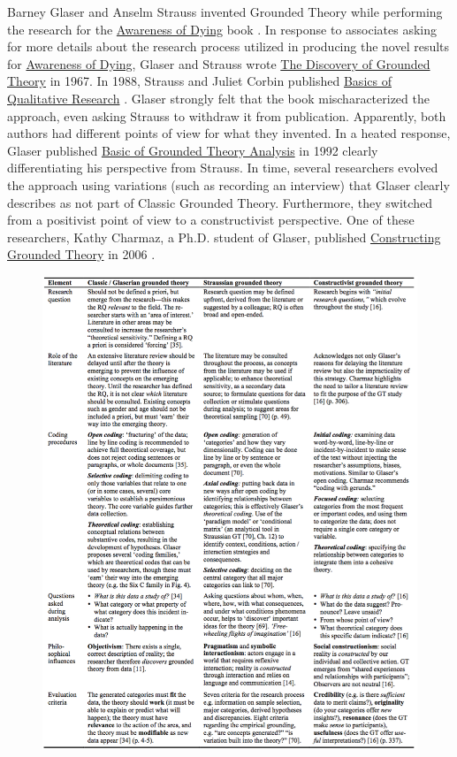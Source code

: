 Barney Glaser and Anselm Strauss invented Grounded Theory while performing the research for the \ul{Awareness of Dying} book \cite{GlaserAwarenessOfDying}. In response to associates asking for more details about the research process utilized in producing the novel results for \ul{Awareness of Dying}, Glaser and Strauss wrote \ul{The Discovery of Grounded Theory} \cite{GlaserDiscovery} in 1967. In 1988, Strauss and Juliet Corbin published \ul{Basics of Qualitative Research} \cite{Strauss1988Basics}. Glaser strongly felt that the book mischaracterized the approach, even asking Strauss to withdraw it from publication. Apparently, both authors had different points of view for what they invented. In a heated response, Glaser published \ul{Basic of Grounded Theory Analysis} in 1992 clearly differentiating his perspective from Strauss. In time, several researchers evolved the approach using variations (such as recording an interview) that Glaser clearly describes as not part of Classic Grounded Theory. Furthermore, they switched from a positivist point of view to a constructivist perspective. One of these researchers, Kathy Charmaz, a Ph.D. student of Glaser, published \ul{Constructing Grounded Theory} in 2006 \cite{Charmaz}. 

\begin{figure}[t]
\centering
{}
\label{GroundedTheoryComparison}
\includegraphics[width=6.4in]{grounded_theory_images/stohl_grounded_theory_comparison.png}
\end{figure}


